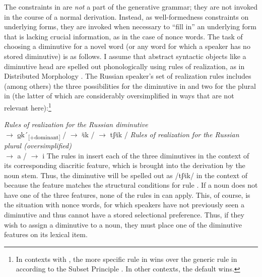 \documentclass[output=paper,colorlinks,citecolor=brown
]{langscibook}
\begin{document}
The constraints in  are \emph{not} a part of the generative grammar; they are not invoked in the course of a normal derivation. Instead, as well-formedness constraints on underlying forms, they are invoked when necessary to ``fill in'' an underlying form \citep[cf.][]{Gouskova.etal2015} that is lacking crucial information, as in the case of nonce words. %
The task of choosing a diminutive for a novel word (or any word for which a speaker has no stored diminutive) is as follows. I assume that abstract syntactic objects like a diminutive head are spelled out phonologically using rules of realization, as in Distributed Morphology \citep[see e.g.][]{Halle.Marantz1993,Harley.Noyer1999,Steriopolo2008}. The Russian speaker's set of realization rules includes (among others) the three possibilities for the diminutive in  and two for the plural in  (the latter of which are considerably oversimplified in ways that are not relevant here):\footnote{In contexts with , the more specific rule in  wins over the generic rule in  according to the Subset Principle \citep{Halle1997b}. In other contexts, the default  wins.}

\ea\label{ex:dimvis} \emph{Rules of realization for the Russian diminutive}\\
    \ea\label{ex:okvi} \DIM{} $\rightarrow$ \underline{o}k´\textsubscript{[$+$dominant]} / \gap
    \ex\label{ex:ikvi} \DIM{} $\rightarrow$ ʲik / \gap
    \ex\label{ex:chikvi} \DIM{} $\rightarrow$ tʃʲik / \gap
    \z
\ex\label{ex:plvis} \emph{Rules of realization for the Russian plural (oversimplified)}\\
    \ea\label{ex:avi} \NOM{} \PL{} $\rightarrow$ a / \gap
    \ex\label{ex:ivi} \NOM{} \PL{} $\rightarrow$ i
    \z
\z
The rules in  insert each of the three diminutives in the context of its corresponding diacritic feature, which is brought into the derivation by the noun stem. Thus, the diminutive will be spelled out as /tʃʲik/ in the context of  because the  feature matches the structural conditions for rule . If a noun does not have one of the three features, none of the rules in  can apply. This, of course, is the situation with nonce words, for which speakers have not previously seen a diminutive and thus cannot have a stored selectional preference. Thus, if they wish to assign a diminutive to a noun, they must place one of the diminutive features on its lexical item.
\end{document}
